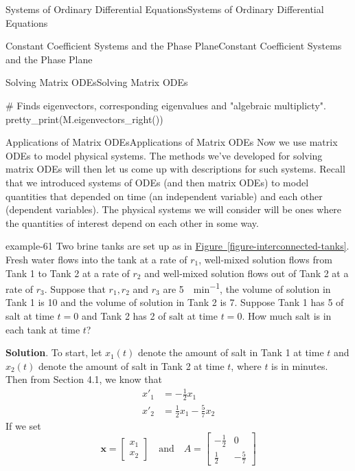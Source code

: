 \documentclass[10pt,]{book}
\numberwithin{equation}{section}
\renewcommand{\vec}[1]{\mathbf{#1}}
\newcommand{\qq}[1]{\quad\text{#1}\quad}
\newcommand{\amp}{&}
\begin{document}
\begin{chapterptx}{Systems of Ordinary Differential Equations}{}{Systems of Ordinary Differential Equations}{}{}
\begin{sectionptx}{Constant Coefficient Systems and the Phase Plane}{}{Constant Coefficient Systems and the Phase Plane}{}{}
\begin{subsectionptx}{Solving Matrix ODEs}{}{Solving Matrix ODEs}{}{}
\begin{sageinput}
# Finds eigenvectors, corresponding eigenvalues and "algebraic multiplicty".
pretty_print(M.eigenvectors_right())
\end{sageinput}
\end{subsectionptx}
%
%
\typeout{************************************************}
\typeout{************************************************}
%
\begin{subsectionptx}{Applications of Matrix ODEs}{}{Applications of Matrix ODEs}{}{}\label{subsection-applications-of-matrix-odes}
\hypertarget{p-359}{}%
Now we use matrix ODEs to model physical systems. The methods we've developed for solving matrix ODEs will then let us come up with descriptions for such systems. Recall that we introduced systems of ODEs (and then matrix ODEs) to model quantities that depended on time (an independent variable) and each other (dependent variables). The physical systems we will consider will be ones where the quantities of interest depend on each other in some way.%
\begin{example}{}{example-61}%
\hypertarget{p-360}{}%
Two brine tanks are set up as in \hyperref[figure-interconnected-tanks]{Figure~\ref{figure-interconnected-tanks}}. Fresh water flows into the tank at a rate of \(r_{1}\), well-mixed solution flows from Tank 1 to Tank 2 at a rate of \(r_{2}\) and well-mixed solution flows out of Tank 2 at a rate of \(r_{3}\). Suppose that \(r_{1}, r_{2}\) and  \(r_{3}\) are \SI{5}{\gallon\per\minute}, the volume of solution in Tank 1 is \SI{10}{\gallon} and the volume of solution in Tank 2 is \SI{7}{\gallon}. Suppose Tank 1 has \SI{5}{\pound} of salt at time \(t=0\) and Tank 2 has \SI{2}{\pound} of salt at time \(t=0\). How much salt is in each tank at time \(t\)?%
\par\smallskip%
\noindent\textbf{Solution}.\hypertarget{solution-58}{}\quad%
\hypertarget{p-361}{}%
To start, let \(x_{1}(t)\) denote the amount of salt in Tank 1 at time \(t\) and \(x_{2}(t)\) denote the amount of salt in Tank 2 at time \(t\), where \(t\) is in minutes. Then from Section 4.1, we know that%
\begin{align*}
x'_{1} \amp = -\frac{1}{2}x_{1}\\
x'_{2} \amp = \frac{1}{2}x_{1}-\frac{5}{7}x_{2}
\end{align*}
If we set%
\begin{equation*}
\vec{x} = \begin{bmatrix} x_{1} \\ x_{2} \end{bmatrix} \qq{and} A = \begin{bmatrix}-\frac{1}{2} \amp  0 \\ \frac{1}{2} \amp  -\frac{5}{7}\end{bmatrix}

\end{equation*}
\end{example}
\end{subsectionptx}
\end{sectionptx}
\end{chapterptx}
\end{document}
